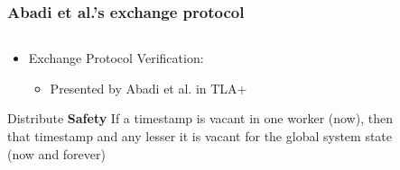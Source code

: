 \documentclass[aspectratio=169,10pt]{beamer}
\begin{document}
\begin{frame}
  \frametitle{Abadi et al.’s exchange protocol}
  \begin{columns}
    \begin{column}{.45\textwidth}
      \begin{itemize}
        \item Exchange Protocol Verification:
              \begin{itemize}
                \item Presented by Abadi et al. in TLA+
              \end{itemize}
              \pause
      \end{itemize}
      \begin{block}{Distribute \textbf{Safety}}
        If a timestamp is vacant in one worker (now), then that timestamp and any lesser it is vacant for the global system state (now and forever)
      \end{block}
    \end{column}
    \begin{column}{.45\textwidth}
      \begin{figure}
      \end{figure}
    \end{column}
  \end{columns}
\end{frame}
\end{document}
